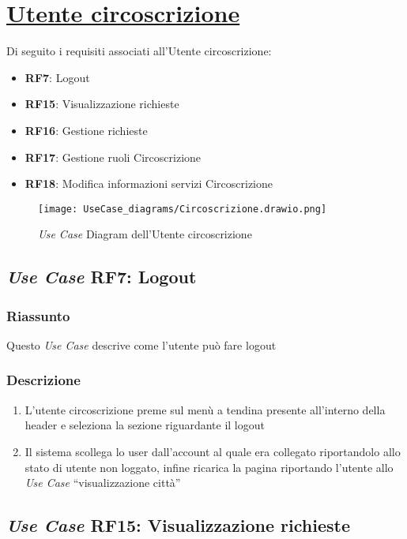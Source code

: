 \section{\underline{Utente circoscrizione}}
    Di seguito i requisiti associati all'Utente circoscrizione:
    \begin{itemize}
        \item \textbf{RF7}: Logout
        \item \textbf{RF15}: Visualizzazione richieste
        \item \textbf{RF16}: Gestione richieste
        \item \textbf{RF17}: Gestione ruoli Circoscrizione
        \item \textbf{RF18}: Modifica informazioni servizi Circoscrizione
    \end{itemize}
    \begin{figure}[H]
        \centering
        \texttt{[image: UseCase\_diagrams/Circoscrizione.drawio.png]}
        \caption{\textit{Use Case} Diagram dell'Utente circoscrizione}
    \end{figure}

    \subsection{\textit{Use Case} RF7: Logout}
        \subsubsection{Riassunto}
            Questo \textit{Use Case} descrive come l'utente può fare logout
        \subsubsection{Descrizione}
            \begin{enumerate}
                \item L'utente circoscrizione preme sul menù a tendina presente all'interno della header e seleziona la sezione riguardante il logout
                \item Il sistema scollega lo user dall'account al quale era collegato riportandolo allo stato di utente non loggato, infine 
                ricarica la pagina riportando l'utente allo \textit{Use Case} ``visualizzazione città''
            \end{enumerate}

    \subsection{\textit{Use Case} RF15: Visualizzazione richieste}
